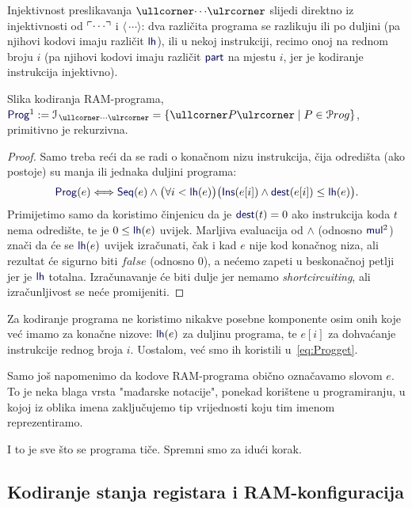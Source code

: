 Injektivnost preslikavanja $\kprog{\cdots}$ slijedi direktno iz injektivnosti od $\ulcorner\cdots\urcorner$ i $\langle\,\cdots\rangle$: dva različita programa se razlikuju ili po duljini (pa njihovi kodovi imaju različit $\f{lh}$), ili u nekoj instrukciji, recimo onoj na rednom broju $i$ (pa njihovi kodovi imaju različit $\f{part}$ na mjestu $i$, jer je kodiranje instrukcija injektivno).

\begin{lema}
    Slika kodiranja RAM-programa, $\f{Prog}^1:=\im{\,\kprog{\cdots}}=\{\kprog P\mid P\in\mathcal Prog\}$, primitivno je rekurzivna.
\end{lema}
\begin{proof}
Samo treba reći da se radi o konačnom nizu instrukcija, čija odredišta (ako postoje) su manja ili jednaka duljini programa:
\begin{equation}\label{eq:Progget}
    \f{Prog}(e)\Longleftrightarrow\f{Seq}(e)\wedge\bigl(\forall i<\f{lh}(e)\bigr)\bigl(\f{Ins}(e[i])\land\f{dest}(e[i])\le \f{lh}(e)\bigr)\text.\\
\end{equation}
Primijetimo samo da koristimo činjenicu da je $\f{dest}(t)=0$ ako instrukcija koda $t$ nema od\-re\-di\-šte, te je $0\le\f{lh}(e)$ uvijek. Marljiva evaluacija od $\land$ (odnosno $\f{mul}^2$) znači da će se $\f{lh}(e)$ uvijek izračunati, čak i kad $e$ nije kod konačnog niza, ali rezultat će sigurno biti $\mathit{false}$ (odnosno $0$), a nećemo zapeti u beskonačnoj petlji jer je $\f{lh}$ totalna. Izračunavanje će biti dulje jer nemamo \emph{shortcircuiting}, ali izračunljivost se neće promijeniti.
\end{proof}

Za kodiranje programa ne koristimo nikakve posebne komponente osim onih koje već imamo za konačne nizove: $\f{lh}(e)$ za duljinu programa, te $e[i]$ za dohvaćanje instrukcije rednog broja $i$. Uostalom, već smo ih koristili u~\eqref{eq:Progget}.

Samo još napomenimo da kodove RAM-programa obično označavamo slovom $e$. To je neka blaga vrsta "mađarske notacije", ponekad korištene u programiranju, u kojoj iz oblika imena zaključujemo tip vrijednosti koju tim imenom reprezentiramo.

I to je sve što se programa tiče. Spremni smo za idući korak.

\subsection{Kodiranje stanja registara i RAM-konfiguracija}

